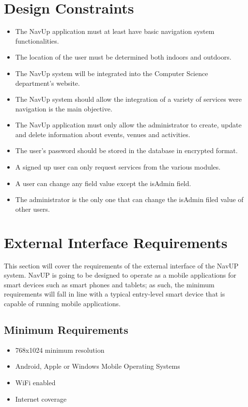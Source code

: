 \documentclass[12pt,a4paper]{article}
\begin{document}


\tableofcontents
\newpage

\section{Design Constraints}
	\begin{itemize}
		\item The NavUp application must at least have basic navigation system functionalities.
		\item The location  of the user must be determined both indoors and outdoors.
		\item The NavUp system will be integrated into the Computer Science department's website.
		\item The NavUp system should allow the integration of a variety of services were navigation is the main objective.
		\item The NavUp application must only allow the administrator to create, update and delete information about events, venues and activities.
		\item The user’s password should be stored in the database in encrypted format.
		\item A signed up user can only request services from the various modules.
		\item A user can change any field value except the isAdmin field.
		\item The administrator is the only one that can change the isAdmin filed value of other users.
 
		
	\end{itemize}
    
\section{External Interface Requirements}
This section will cover the requirements of the external interface of the NavUP system. NavUP is going to be designed to operate as a mobile applications for smart devices such as smart phones and tablets; as such, the minimum requirements will fall in line with a typical entry-level smart device that is capable of running mobile applications.\newline

    \subsection{Minimum Requirements}
        \begin{itemize}
            \item 768x1024 minimum resolution
            \item Android, Apple or Windows Mobile Operating Systems
            \item WiFi enabled
            \item Internet coverage
        \end{itemize}
     
\end{document}
